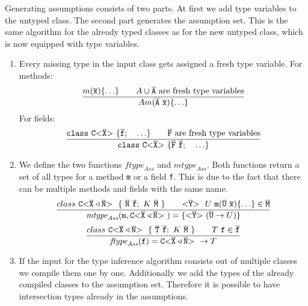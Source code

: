 \documentclass[runningheads]{llncs}
\begin{document}

Generating assumptions consists of two parts.
At first we add type variables to the untyped class.
The second part generates the assumption set.
This is the same algorithm for the already typed classes as for the 
new untyped class, which is now equipped with type variables.

\begin{enumerate}
\item Every missing type in the input class gets assigned a fresh type variable.
For methods:
\begin{align*}
  \frac{\displaystyle 
  m(\overline{\tt x}) \{ \ldots \} \quad \quad A \cup \overline{\tt A} \ \text{are fresh type variables}
  }{\displaystyle 
  A m(\overline{\tt A}\ \overline{\tt x}) \{ \ldots \}
  }
  \end{align*}
  For fields:
\begin{align*}
  \frac{\displaystyle 
  \texttt{class}\ \mathtt{C {\tt <} \overline{\tt X} {\tt >} \ } \{ \overline{\tt f}; \quad \ldots \} \quad \quad \overline{\tt F} \ \text{are fresh type variables}
  }{\displaystyle 
    \texttt{class}\ \mathtt{C {\tt <} \overline{\tt X} {\tt >} \ } \{ \overline{\tt F} \ \overline{\tt f}; \quad \ldots \}
  }
\end{align*}
\item We define the two functions $\textit{ftype}_\textit{Ass}$ and $\textit{mtype}_\textit{Ass}$.
Both functions return a set of all types for a method \texttt{m} or a field \texttt{f}.
This is due to the fact that there can be multiple methods and fields with the same name.
\begin{align*}
  \frac{\displaystyle 
    class\ \mathtt{C {\tt <} \overline{\tt X} \triangleleft \overline{\tt N} {\tt >} \ }\ \{\ \overline{\tt N}\ \overline{\tt f};\ K\ \overline{\tt M}\ \} \quad \quad
    \mathtt{ {\tt <} \overline{\tt Y} {\tt >} \ }\ U\ \texttt{m}(\overline{\tt U}\ \overline{\tt x}) \{ \ldots \} \in \overline{\tt M}
  }{\displaystyle 
    \textit{mtype}_\textit{Ass}(\texttt{m}, \mathtt{C {\tt <} \overline{\tt X} \triangleleft \overline{\tt N} {\tt >} \ }) =  \{ \mathtt{ {\tt <} \overline{\tt Y} {\tt >} \ } (\overline{\tt U} \to U ) \}
  }
\end{align*}
\begin{align*}
  \frac{\displaystyle 
    class\ \mathtt{C {\tt <} \overline{\tt X} \triangleleft \overline{\tt N} {\tt >} \ }\ \{\ \overline{\tt T}\ \overline{\tt f};\ K\ \overline{\tt M}\ \} \quad \quad
    T\ \texttt{f} \in \overline{\tt f}
  }{\displaystyle 
    \textit{ftype}_\textit{Ass}(\texttt{f}) = \mathtt{C {\tt <} \overline{\tt X} \triangleleft \overline{\tt N} {\tt >} \ } \to T
  }
\end{align*}
\item If the input for the type inference algorithm consists out of multiple classes we compile them one by one.
Additionally we add the types of the already compiled classes to the assumption set.
Therefore it is possible to have intersection types already in the assumptions.
\end{enumerate}
\end{document}
